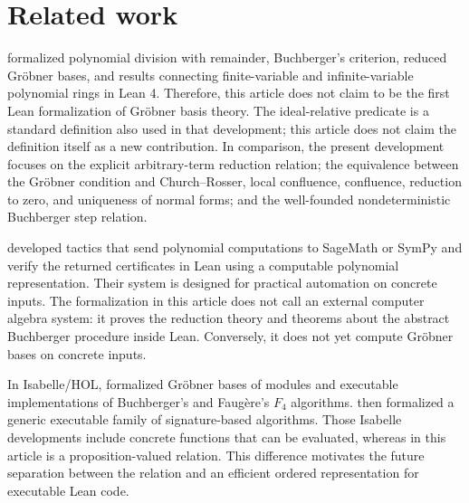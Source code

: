 \section{Related work}\label{sec:related-work}

\citet{GuoEtAl2026} formalized polynomial division with remainder,
Buchberger's criterion, reduced Gr\"obner bases, and results connecting
finite-variable and infinite-variable polynomial rings in Lean 4.  Therefore,
this article does not claim to be the first Lean formalization of Gr\"obner
basis theory.  The ideal-relative predicate  is a
standard definition also used in that development; this article does not
claim the definition itself as a new contribution.  In comparison, the
present development focuses on the explicit arbitrary-term reduction relation; the
equivalence between the Gr\"obner condition and Church--Rosser, local
confluence, confluence, reduction to zero, and uniqueness of normal forms;
and the well-founded nondeterministic Buchberger step relation.

\citet{ShenEtAl2026} developed tactics that send polynomial computations to
SageMath or SymPy and verify the returned certificates in Lean using a
computable polynomial representation.  Their system is designed for practical
automation on concrete inputs.  The formalization in this article does not call
an external computer algebra system: it proves the reduction theory and theorems about the abstract Buchberger
procedure inside Lean.  Conversely, it does not yet compute Gr\"obner bases on
concrete inputs.

In Isabelle/HOL, \citet{MaletzkyImmler2018} formalized Gr\"obner bases of
modules and executable implementations of Buchberger's and Faug\`ere's $F_4$
algorithms.  \citet{Maletzky2021} then formalized a generic executable family
of signature-based algorithms.  Those Isabelle developments include concrete
functions that can be evaluated, whereas  in this article
is a proposition-valued relation.  This difference motivates the future
separation between the relation  and an efficient
ordered representation for executable Lean code.
